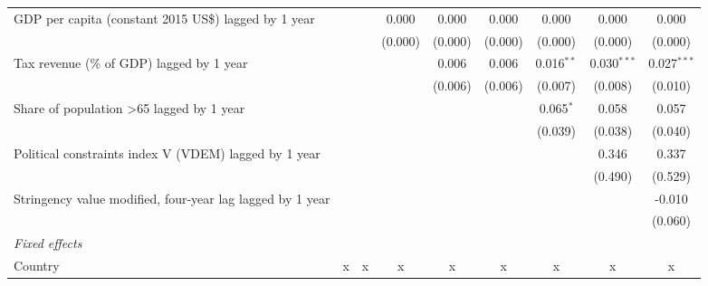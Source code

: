 \begin{tabular}{lcccccccc}
   GDP per capita (constant 2015 US\$) lagged by 1 year                   &              &              & 0.000        & 0.000        & 0.000        & 0.000        & 0.000         & 0.000\\   
                                                                          &              &              & (0.000)      & (0.000)      & (0.000)      & (0.000)      & (0.000)       & (0.000)\\   
   Tax revenue (\% of GDP) lagged by 1 year                               &              &              &              & 0.006        & 0.006        & 0.016$^{**}$ & 0.030$^{***}$ & 0.027$^{***}$\\   
                                                                          &              &              &              & (0.006)      & (0.006)      & (0.007)      & (0.008)       & (0.010)\\   
   Share of population >65 lagged by 1 year                               &              &              &              &              &              & 0.065$^{*}$  & 0.058         & 0.057\\   
                                                                          &              &              &              &              &              & (0.039)      & (0.038)       & (0.040)\\   
   Political constraints index V (VDEM) lagged by 1 year                  &              &              &              &              &              &              & 0.346         & 0.337\\   
                                                                          &              &              &              &              &              &              & (0.490)       & (0.529)\\   
   Stringency value modified, four-year lag lagged by 1 year              &              &              &              &              &              &              &               & -0.010\\   
                                                                          &              &              &              &              &              &              &               & (0.060)\\   
   \emph{Fixed effects}\\
   Country                                                                & x            & x            & x            & x            & x            & x            & x             & x\\  

\end{tabular}
